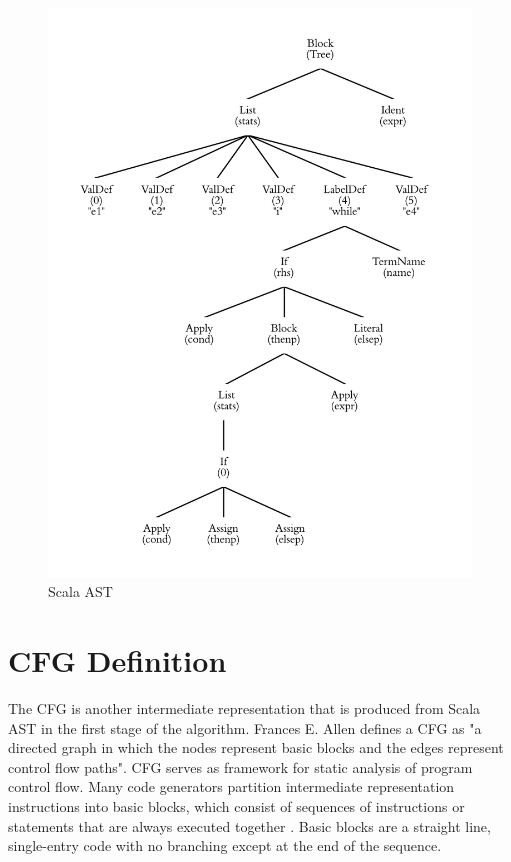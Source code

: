 \begin{figure}[h!]
\centering
\includegraphics[width=0.8\linewidth]{figures/Tree}
\caption{Scala AST}
\label{fig:Tree}
\end{figure}

\section{CFG Definition}
The CFG is another intermediate representation that is produced from Scala AST in the first stage of the algorithm. Frances E. Allen \cite{allen1970control} defines a CFG as "a directed graph in which the nodes represent basic blocks and the edges represent control flow paths". CFG serves as framework for static analysis of program control flow. Many code generators partition intermediate representation instructions into basic blocks, which consist of sequences of instructions or statements that are always executed together \cite{lam2006compilers}. Basic blocks are a straight line, single-entry code with no branching except at the end of the sequence. 

